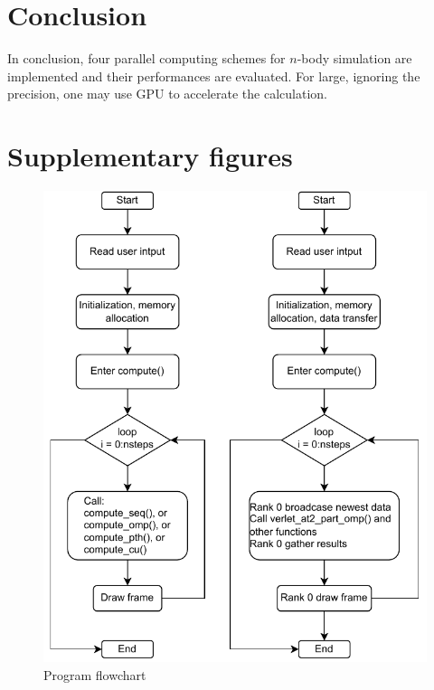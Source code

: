 \documentclass[twoside,12pt]{article}
\theoremstyle{definition}
\theoremstyle{remark}
\begin{document}
\section{Conclusion}
In conclusion, four parallel computing schemes for $n$-body simulation 
are implemented and their performances are evaluated.
For large, ignoring the precision, one may use GPU to accelerate
the calculation.


\appendix

\newpage
\section{Supplementary figures}

\begin{figure}[h!]
    \centering
    \includegraphics[width=\textwidth]{../flowchart.drawio.pdf}
    \caption{Program flowchart}
    \label{fig:flowchart}
\end{figure}
\end{document}

